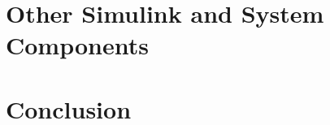 \documentclass[12pt]{enscStyle}
\renewcommand{\baselinestretch}{1.5}
\begin{document}












%
%
\chapter{Other Simulink and System Components}



%




%
%
\chapter{Conclusion} %








\cleardoublepage




\cleardoublepage

\begin{appendix}

\renewcommand{\baselinestretch}{1.1}



\cleardoublepage



\end{appendix}
\end{document}
